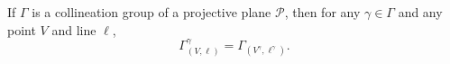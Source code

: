 If $\Gamma$ is a collineation group of a projective plane $\mathcal{P}$, then for any $\gamma \in \Gamma$ and any point $V$ and line $\ell$,
$$\Gamma_{(V,\ell)}^\gamma = \Gamma_{(V^\gamma,\ell^\gamma)}.$$
